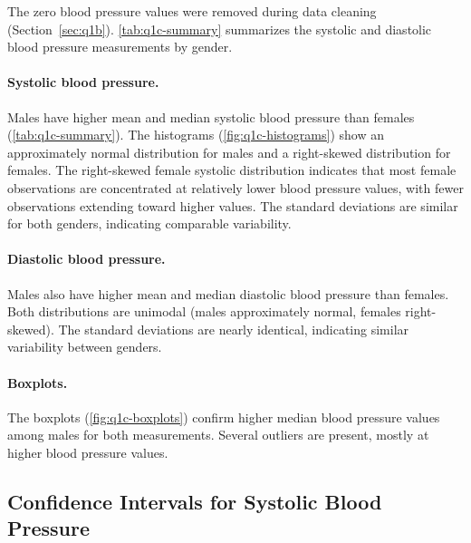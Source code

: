 The zero blood pressure values were removed during data cleaning (Section~\ref{sec:q1b}).
\autoref{tab:q1c-summary} summarizes the systolic and diastolic blood pressure measurements by gender.

\paragraph{Systolic blood pressure.}
Males have higher mean and median systolic blood pressure than females (\autoref{tab:q1c-summary}).
The histograms (\autoref{fig:q1c-histograms}) show an approximately normal distribution for males and a right-skewed distribution for females. 
The right-skewed female systolic distribution indicates that most female observations are concentrated at relatively lower blood pressure values, with fewer observations extending toward higher values. 
The standard deviations are similar for both genders, indicating comparable variability.

\paragraph{Diastolic blood pressure.}
Males also have higher mean and median diastolic blood pressure than females.
Both distributions are unimodal (males approximately normal, females right-skewed).
The standard deviations are nearly identical, indicating similar variability between genders.

\paragraph{Boxplots.}
The boxplots (\autoref{fig:q1c-boxplots}) confirm higher median blood pressure values among males for both measurements.
Several outliers are present, mostly at higher blood pressure values.


\subsection{Confidence Intervals for Systolic Blood Pressure}\label{sec:q1d}

